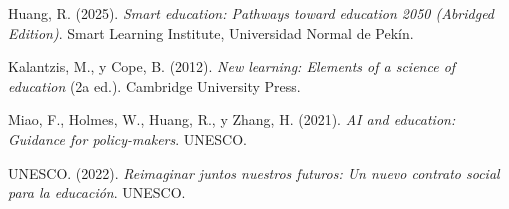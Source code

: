 \documentclass[12pt,a4paper]{article}
\begin{document}
\vspace{0.4cm}
\noindent Huang, R. (2025). \textit{Smart education: Pathways toward education 2050 (Abridged Edition)}. Smart Learning Institute, Universidad Normal de Pekín.

\vspace{0.4cm}
\noindent Kalantzis, M., y Cope, B. (2012). \textit{New learning: Elements of a science of education} (2a ed.). Cambridge University Press.

\vspace{0.4cm}
\noindent Miao, F., Holmes, W., Huang, R., y Zhang, H. (2021). \textit{AI and education: Guidance for policy-makers}. UNESCO.

\vspace{0.4cm}
\noindent UNESCO. (2022). \textit{Reimaginar juntos nuestros futuros: Un nuevo contrato social para la educación}. UNESCO.
\end{document}
